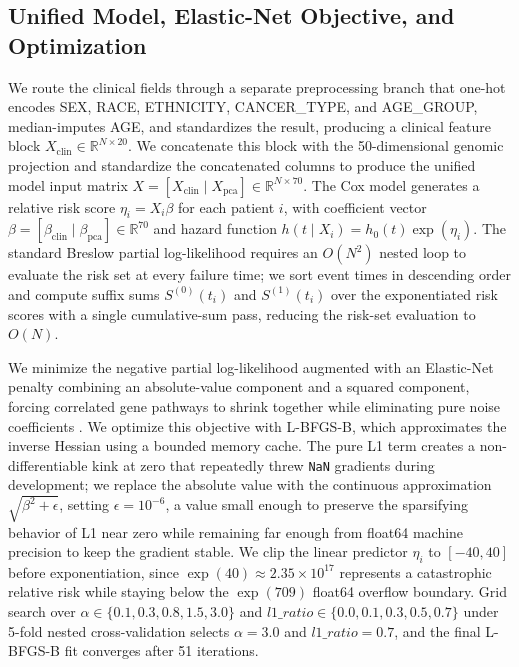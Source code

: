 \documentclass[10pt,a4paper]{article}
\begin{document}
\subsection{Unified Model, Elastic-Net Objective, and Optimization}
We route the clinical fields through a separate preprocessing branch that one-hot encodes SEX, RACE, ETHNICITY, CANCER\_TYPE, and AGE\_GROUP, median-imputes AGE, and standardizes the result, producing a clinical feature block $X_{\text{clin}} \in \mathbb{R}^{N \times 20}$. We concatenate this block with the 50-dimensional genomic projection and standardize the concatenated columns to produce the unified model input matrix $X = [X_{\text{clin}} \mid X_{\text{pca}}] \in \mathbb{R}^{N \times 70}$. The Cox model generates a relative risk score $\eta_i = X_i \beta$ for each patient $i$, with coefficient vector $\beta = [\beta_{\text{clin}} \mid \beta_{\text{pca}}] \in \mathbb{R}^{70}$ and hazard function $h(t \mid X_i) = h_0(t) \exp(\eta_i)$. The standard Breslow partial log-likelihood \cite{breslow1972discussion} requires an $O(N^2)$ nested loop to evaluate the risk set at every failure time; we sort event times in descending order and compute suffix sums $S^{(0)}(t_i)$ and $S^{(1)}(t_i)$ over the exponentiated risk scores with a single cumulative-sum pass, reducing the risk-set evaluation to $O(N)$.

We minimize the negative partial log-likelihood augmented with an Elastic-Net penalty combining an absolute-value component and a squared component, forcing correlated gene pathways to shrink together while eliminating pure noise coefficients \cite{wu2012elastic, tibshirani1997lasso}. We optimize this objective with L-BFGS-B, which approximates the inverse Hessian using a bounded memory cache. The pure L1 term creates a non-differentiable kink at zero that repeatedly threw \texttt{NaN} gradients during development; we replace the absolute value with the continuous approximation $\sqrt{\beta^2 + \epsilon}$, setting $\epsilon = 10^{-6}$, a value small enough to preserve the sparsifying behavior of L1 near zero while remaining far enough from float64 machine precision to keep the gradient stable. We clip the linear predictor $\eta_i$ to $[-40, 40]$ before exponentiation, since $\exp(40) \approx 2.35 \times 10^{17}$ represents a catastrophic relative risk while staying below the $\exp(709)$ float64 overflow boundary. Grid search over $\alpha \in \{0.1, 0.3, 0.8, 1.5, 3.0\}$ and $l1\_ratio \in \{0.0, 0.1, 0.3, 0.5, 0.7\}$ under 5-fold nested cross-validation selects $\alpha = 3.0$ and $l1\_ratio = 0.7$, and the final L-BFGS-B fit converges after 51 iterations.
\end{document}
